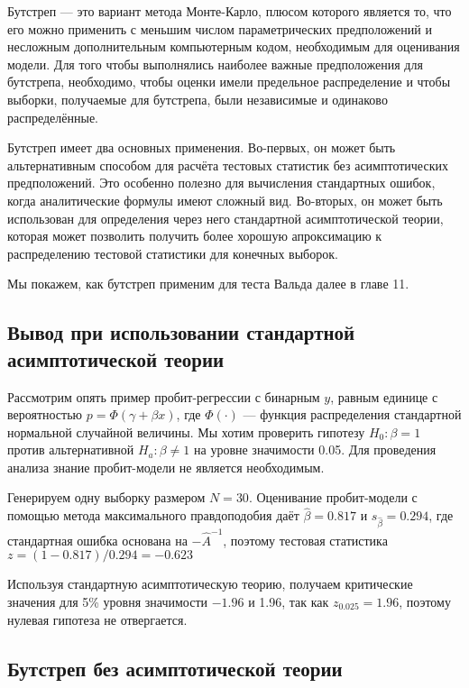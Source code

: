 Бутстреп --- это вариант метода Монте-Карло, плюсом которого является то, что его можно применить с меньшим числом параметрических предположений и несложным дополнительным компьютерным кодом, необходимым для оценивания модели. Для того чтобы выполнялись наиболее важные предположения для бутстрепа, необходимо, чтобы оценки имели предельное распределение и чтобы выборки, получаемые для бутстрепа, были независимые и одинаково распределённые.

Бутстреп имеет два основных применения. Во-первых, он может быть альтернативным способом для расчёта тестовых статистик без асимптотических предположений. Это особенно полезно для вычисления стандартных ошибок, когда аналитические формулы имеют сложный вид. Во-вторых, он может быть использован для определения через него стандартной асимптотической теории, которая может позволить получить более хорошую апроксимацию к распределению тестовой статистики для конечных выборок.

Мы покажем, как бутстреп применим для теста Вальда далее в главе 11.
 
 
\subsection{Вывод при использовании стандартной асимптотической теории}

Рассмотрим опять пример пробит-регрессии с бинарным $y$, равным единице с вероятностью $p = \Phi (\gamma + \beta x)$, где $\Phi(\cdot)$ --- функция распределения стандартной нормальной случайной величины. Мы хотим проверить гипотезу $H_0: \beta = 1$ против альтернативной $H_a: \beta \not= 1$ на уровне значимости 0.05. Для проведения анализа знание пробит-модели не является необходимым.

Генерируем одну выборку размером $N = 30$. Оценивание пробит-модели с помощью метода максимального правдоподобия даёт $\hat{\beta} = 0.817$ и $s_{\hat{\beta}} = 0.294$, где стандартная ошибка основана на $- \hat{A}^{-1}$, поэтому тестовая статистика $z = (1 - 0.817)/0.294 = - 0.623$

Используя стандартную асимптотическую теорию, получаем критические значения для 5\% уровня значимости $- 1.96$ и 1.96, так как $z_{0.025} = 1.96$, поэтому нулевая гипотеза не отвергается.


\subsection{Бутстреп без асимптотической теории}

